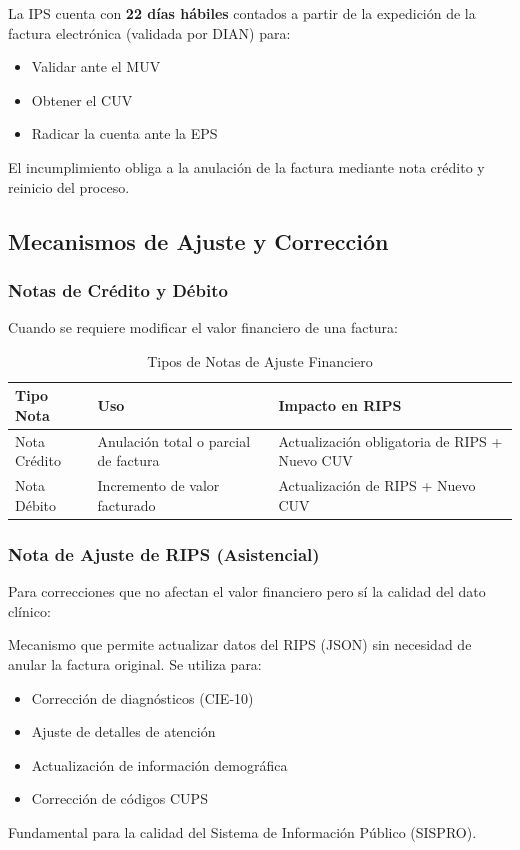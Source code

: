 \documentclass[12pt,letterpaper]{report}
\begin{document}
\begin{marcolegal}
La IPS cuenta con \textbf{22 días hábiles} contados a partir de la expedición de la factura electrónica (validada por DIAN) para:
\begin{itemize}
    \item Validar ante el MUV
    \item Obtener el CUV
    \item Radicar la cuenta ante la EPS
\end{itemize}
El incumplimiento obliga a la anulación de la factura mediante nota crédito y reinicio del proceso.
\end{marcolegal}

\subsection{Mecanismos de Ajuste y Corrección}

\subsubsection{Notas de Crédito y Débito}

Cuando se requiere modificar el valor financiero de una factura:

\begin{table}[H]
\centering
\caption{Tipos de Notas de Ajuste Financiero}
\begin{tabular}{@{}p{3cm}p{5cm}p{6cm}@{}}
\toprule
\textbf{Tipo Nota} & \textbf{Uso} & \textbf{Impacto en RIPS} \\
\midrule
Nota Crédito & Anulación total o parcial de factura & Actualización obligatoria de RIPS + Nuevo CUV \\
Nota Débito & Incremento de valor facturado & Actualización de RIPS + Nuevo CUV \\
\bottomrule
\end{tabular}
\end{table}

\subsubsection{Nota de Ajuste de RIPS (Asistencial)}

Para correcciones que no afectan el valor financiero pero sí la calidad del dato clínico:

\begin{definicion}
Mecanismo que permite actualizar datos del RIPS (JSON) sin necesidad de anular la factura original. Se utiliza para:
\begin{itemize}
    \item Corrección de diagnósticos (CIE-10)
    \item Ajuste de detalles de atención
    \item Actualización de información demográfica
    \item Corrección de códigos CUPS
\end{itemize}
Fundamental para la calidad del Sistema de Información Público (SISPRO).
\end{definicion}
\end{document}
